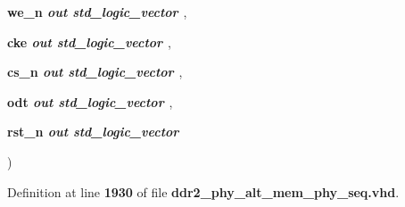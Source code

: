 {\begin{DoxyParamCaption}
\item[{\textcolor{keywordtype}{ } }]{{\bfseries {\bfseries {\bf we\+\_\+n}} \textcolor{vhdlchar}{ }}\textcolor{stringliteral}{} {\em {\bfseries \textcolor{keywordflow}{out}\textcolor{vhdlchar}{ }\textcolor{comment}{std\+\_\+logic\+\_\+vector}\textcolor{vhdlchar}{ }\textcolor{vhdlchar}{ }\textcolor{vhdlchar}{ }}} , }
\item[{\textcolor{keywordtype}{ } }]{{\bfseries {\bfseries {\bf cke}} \textcolor{vhdlchar}{ }}\textcolor{stringliteral}{} {\em {\bfseries \textcolor{keywordflow}{out}\textcolor{vhdlchar}{ }\textcolor{comment}{std\+\_\+logic\+\_\+vector}\textcolor{vhdlchar}{ }\textcolor{vhdlchar}{ }\textcolor{vhdlchar}{ }}} , }
\item[{\textcolor{keywordtype}{ } }]{{\bfseries {\bfseries {\bf cs\+\_\+n}} \textcolor{vhdlchar}{ }}\textcolor{stringliteral}{} {\em {\bfseries \textcolor{keywordflow}{out}\textcolor{vhdlchar}{ }\textcolor{comment}{std\+\_\+logic\+\_\+vector}\textcolor{vhdlchar}{ }\textcolor{vhdlchar}{ }\textcolor{vhdlchar}{ }}} , }
\item[{\textcolor{keywordtype}{ } }]{{\bfseries {\bfseries {\bf odt}} \textcolor{vhdlchar}{ }}\textcolor{stringliteral}{} {\em {\bfseries \textcolor{keywordflow}{out}\textcolor{vhdlchar}{ }\textcolor{comment}{std\+\_\+logic\+\_\+vector}\textcolor{vhdlchar}{ }\textcolor{vhdlchar}{ }\textcolor{vhdlchar}{ }}} , }
\item[{\textcolor{keywordtype}{ } }]{{\bfseries {\bfseries {\bf rst\+\_\+n}} \textcolor{vhdlchar}{ }}\textcolor{stringliteral}{} {\em {\bfseries \textcolor{keywordflow}{out}\textcolor{vhdlchar}{ }\textcolor{comment}{std\+\_\+logic\+\_\+vector}\textcolor{vhdlchar}{ }\textcolor{vhdlchar}{ }\textcolor{vhdlchar}{ }}}}
\end{DoxyParamCaption}
)\hspace{0.3cm}{\ttfamily [Procedure]}}\label{classddr2__phy__alt__mem__phy__addr__cmd__pkg_a838d2aea12bb482e39fa74d0d6a4b7d0}


Definition at line {\bf 1930} of file {\bf ddr2\+\_\+phy\+\_\+alt\+\_\+mem\+\_\+phy\+\_\+seq.\+vhd}.

